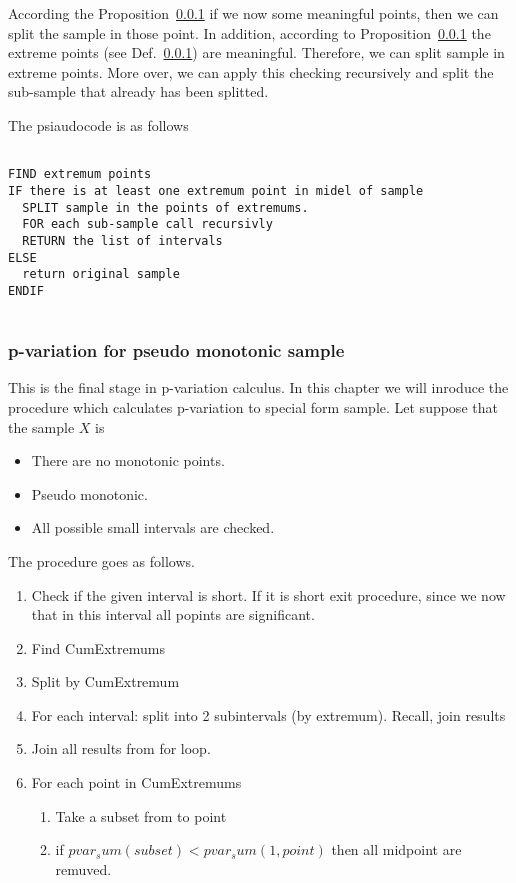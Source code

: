 \documentclass[12pt, a4paper]{article}
\numberwithin{equation}{section}
\begin{document}
According the Proposition~\ref{} if we now some meaningful points,
then we can split the sample in those point. 
In addition, according to Proposition~\ref{} 
the extreme points (see Def.~\ref{}) are meaningful.
Therefore, we can split sample in extreme points.
More over, we can apply this checking recursively and split the
sub-sample that already has been splitted. 

The psiaudocode is as follows
\begin{lstlisting}

FIND extremum points
IF there is at least one extremum point in midel of sample
  SPLIT sample in the points of extremums.
  FOR each sub-sample call recursivly
  RETURN the list of intervals
ELSE
  return original sample
ENDIF  


\end{lstlisting}




\subsubsection{p-variation for pseudo monotonic sample}

This is the final stage in p-variation calculus.
In this chapter we will inroduce the procedure
which calculates p-variation to special form sample.
Let suppose that the sample $X$ is
\begin{itemize}
  \item There are no monotonic points.

  \item Pseudo monotonic.

  \item All possible small intervals are checked.
\end{itemize}

The procedure goes as follows.

\begin{enumerate}

  \item Check if the given interval is short. If it is short
  exit procedure, since we now that in 
  this interval all popints are significant.
  
  \item Find CumExtremums  
  
  \item Split by CumExtremum

  \item For each interval: split into 2 subintervals (by extremum).
  Recall, join results
  
  \item Join all results from for loop.
  
  \item For each point in CumExtremums
  \begin{enumerate}
    \item Take a subset from to point
    \item if $pvar_sum(subset)<pvar_sum(1,point)$	then all midpoint are remuved.
  \end{enumerate}
\end{enumerate}
\end{document}

